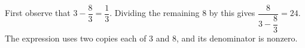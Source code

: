 First observe that $3-\dfrac{8}{3}=\dfrac{1}{3}$. Dividing the remaining $8$ by this gives $\boxed{\dfrac{8}{3-\dfrac{8}{3}}=24}$. The expression uses two copies each of $3$ and $8$, and its denominator is nonzero.
